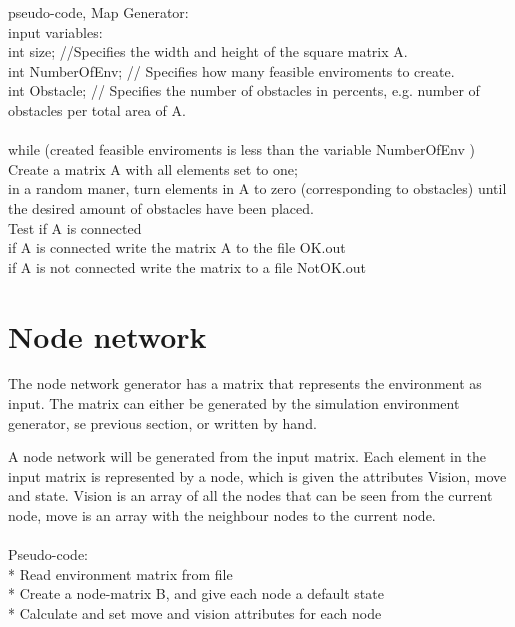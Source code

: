 pseudo-code, Map Generator:\\
input variables:\\
int size; //Specifies the width and height of the square matrix  A.\\
int NumberOfEnv; // Specifies how many feasible enviroments to create.\\
int Obstacle; //  Specifies the number of obstacles in percents, e.g. number of obstacles per total area of A.\\
\\
while (created feasible enviroments is less than the variable NumberOfEnv )\\
	Create a matrix A with all elements set to one; \\
	in a random maner, turn elements in A to zero (corresponding to obstacles) until the desired amount of obstacles have been placed.\\
	Test if A is connected\\
	if A is connected write the matrix A to the file OK.out\\
	if A is not connected write the matrix to a file NotOK.out\\


\section{Node network}
The node network generator has a matrix that represents the environment as input. The matrix can either be generated by the simulation environment generator, se previous section, or written by hand.\\
\par{} A node network will be generated from the input matrix. Each element in the input matrix is represented by a node, which is given the attributes Vision, move and state. Vision is an array of all the nodes that can be seen from the current node, move is an array with the neighbour nodes to the current node.\\
\\
Pseudo-code:\\
* Read environment matrix from file\\
* Create a node-matrix B, and give each node a default state\\
* Calculate and set move and vision attributes for each node\\